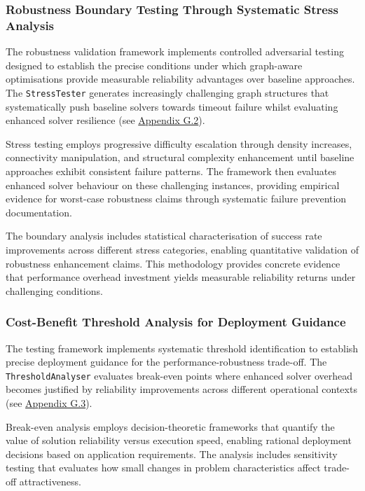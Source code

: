 \subsubsection{Robustness Boundary Testing Through Systematic Stress Analysis}
\label{sec:robustness-boundary-testing}

The robustness validation framework implements controlled adversarial testing designed to establish the precise conditions under which graph-aware optimisations provide measurable reliability advantages over baseline approaches. The \texttt{StressTester} generates increasingly challenging graph structures that systematically push baseline solvers towards timeout failure whilst evaluating enhanced solver resilience (see \hyperref[appendix:stress-generation]{Appendix G.2}).

Stress testing employs progressive difficulty escalation through density increases, connectivity manipulation, and structural complexity enhancement until baseline approaches exhibit consistent failure patterns. The framework then evaluates enhanced solver behaviour on these challenging instances, providing empirical evidence for worst-case robustness claims through systematic failure prevention documentation.

The boundary analysis includes statistical characterisation of success rate improvements across different stress categories, enabling quantitative validation of robustness enhancement claims. This methodology provides concrete evidence that performance overhead investment yields measurable reliability returns under challenging conditions.

\subsubsection{Cost-Benefit Threshold Analysis for Deployment Guidance}
\label{sec:cost-benefit-analysis}

The testing framework implements systematic threshold identification to establish precise deployment guidance for the performance-robustness trade-off. The \texttt{ThresholdAnalyser} evaluates break-even points where enhanced solver overhead becomes justified by reliability improvements across different operational contexts (see \hyperref[appendix:threshold-analysis]{Appendix G.3}).

Break-even analysis employs decision-theoretic frameworks that quantify the value of solution reliability versus execution speed, enabling rational deployment decisions based on application requirements. The analysis includes sensitivity testing that evaluates how small changes in problem characteristics affect trade-off attractiveness.

